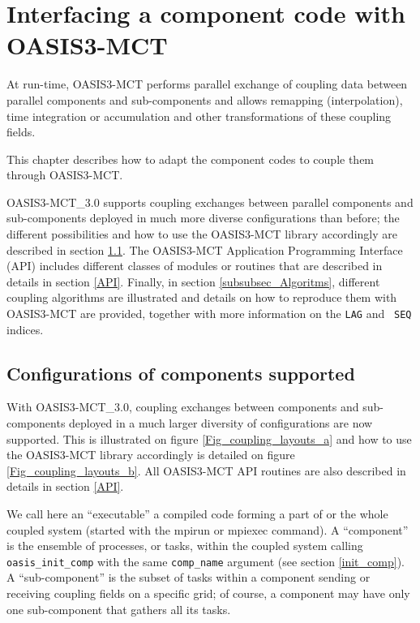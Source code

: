 \newpage
\chapter{Interfacing a component code with OASIS3-MCT}
\label{sec_modelinterfacing}

At run-time, OASIS3-MCT performs parallel exchange of coupling data between parallel
components and sub-components and allows remapping (interpolation), time integration or accumulation and other transformations of these coupling fields. 

This chapter describes how to adapt the component codes to couple them through OASIS3-MCT. 

OASIS3-MCT\_3.0 supports coupling exchanges between parallel
components and sub-components deployed in much more diverse
configurations than before; the different possibilities and how to use
the OASIS3-MCT  library accordingly are described in section
\ref{sec_deploy}. 
The OASIS3-MCT Application Programming Interface (API) includes different classes of modules or routines that are described in details in section \ref{API}.
Finally, in section \ref{subsubsec_Algoritms}, different coupling
algorithms are illustrated and details on how to reproduce them with
OASIS3-MCT are provided, together with more information on the {\tt LAG} and {\tt
  SEQ} indices.

\section{Configurations of components supported}
\label{sec_deploy}

With OASIS3-MCT\_3.0, coupling exchanges between components and
sub-components deployed in a much larger diversity of configurations
are now supported. This is illustrated on figure
\ref{Fig_coupling_layouts_a} and how to use the OASIS3-MCT library
accordingly is detailed on figure \ref{Fig_coupling_layouts_b}. All
OASIS3-MCT API routines are also described in details in section
\ref{API}. 

We call here an ``executable'' a compiled code
  forming a part of or the whole coupled system (started with the
  mpirun or mpiexec command). A ``component'' is the ensemble of
  processes, or tasks, within the coupled system calling {\tt oasis\_init\_comp}
  with the same {\tt comp\_name} argument (see section
  \ref{init_comp}). A ``sub-component'' is the subset of tasks within a
  component sending or receiving coupling fields on a specific grid;
  of course, a component may have only one sub-component
  that gathers all its tasks.

